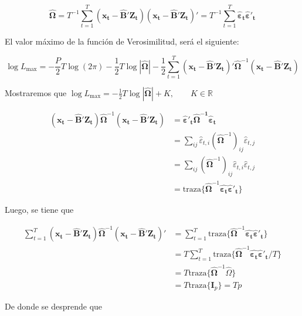 \documentclass[12pt, twoside]{book}\usepackage[]{graphicx}\usepackage[]{color}
\numberwithin{equation}{section}
\numberwithin{theorem}{section}
\numberwithin{teorema}{section}
\numberwithin{defi}{section}
\numberwithin{prop}{section}
\numberwithin{defi}{section}
\theoremstyle{plain}
\begin{document}
\begin{equation}
\boldsymbol{\hat{\Omega}} = T^{-1}\sum_{t=1}^{T}(\mathbf{x_{t}-\hat{B}'Z_{t}})(\mathbf{x_{t}-\hat{B}'Z_{t}})' = T^{-1}\sum_{t=1}^{T}\boldsymbol{\hat{\varepsilon}_{t}\hat{\varepsilon}'_{t}}
\end{equation}

El valor máximo de la función de Verosimilitud, será el siguiente: 

\begin{equation}
\log L _{\max} = -\frac{P}{2}T\log (2\pi)-\frac{1}{2}T\log|\boldsymbol{\hat{\Omega}}|-\frac{1}{2}\sum_{t=1}^{T}(\mathbf{x_{t}-\hat{B}'Z_{t}})'\boldsymbol{\hat{\Omega}}^{-1}(\mathbf{x_{t}-\hat{B}'Z_{t}}) 
\end{equation}

Mostraremos que $\log L_{\max} = -\frac{1}{2}T\log |\boldsymbol{\hat{\Omega}}|+K, \qquad K\in \mathbb{R}$

\begin{align}
(\boldsymbol{x_{t}-\hat{B}'Z_{t}})\boldsymbol{\hat{\Omega}}^{-1}(\mathbf{x_{t}-\hat{B}'Z_{t}}) 
& = \boldsymbol{\hat{\varepsilon}'_{t}\boldsymbol{\hat{\Omega}}^{-1}\hat{\varepsilon}_{t}} \nonumber \\
& = \sum_{ij}\hat{\varepsilon}_{t,i}(\boldsymbol{\hat{\Omega}}^{-1})_{ij}\hat{\varepsilon}_{t,j} \\
& = \sum_{ij}(\boldsymbol{\hat{\Omega}}^{-1})_{ij}\hat{\varepsilon}_{t,i}\hat{\varepsilon}_{t,j} \nonumber \\ 
& = \text{traza}\{\boldsymbol{\hat{\Omega}}^{-1}\boldsymbol{\hat{\varepsilon_{t}}\hat{\varepsilon}'_{t}}\}
\end{align}

Luego, se tiene que 

\begin{align}
\sum_{t=1}^{T}(\mathbf{x_{t}-\hat{B}'Z_{t}})\boldsymbol{\hat{\Omega}}^{-1}(\mathbf{x_{t}-\hat{B}'Z_{t}})' & = \sum_{t=1}^{T}\text{traza}\{\boldsymbol{\hat{\Omega}}^{-1}\boldsymbol{\hat{\varepsilon_{t}}\hat{\varepsilon}'_{t}}\} \\
& = T \sum_{t=1}^{T}\text{traza}\{\boldsymbol{\hat{\Omega}}^{-1}\boldsymbol{\hat{\varepsilon_{t}}\hat{\varepsilon}'_{t}}/T\} \\ 
& = T \text{traza}\{\boldsymbol{\hat{\Omega}}^{-1}\hat{\Omega}\} \\ 
& = T \text{traza}\{\mathbf{I}_{p}\} = Tp
\end{align}

De donde se desprende que 
\end{document}
